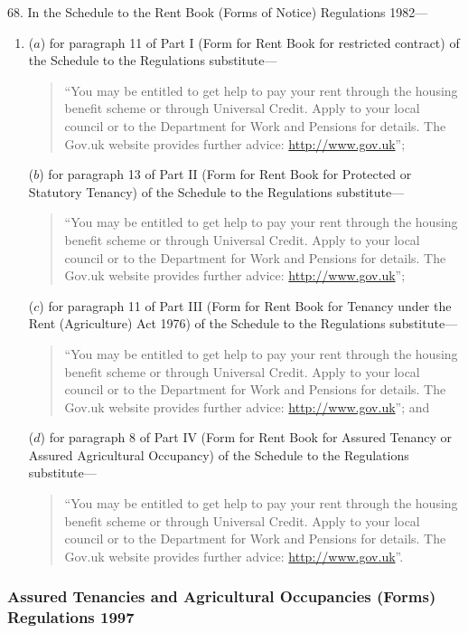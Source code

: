 \documentclass[12pt,a4paper]{article}
\begin{document}
68.  In the Schedule to the Rent Book (Forms of Notice) Regulations 1982—
\begin{enumerate}\item[]
($a$) for paragraph 11 of Part I (Form for Rent Book for restricted contract) of the Schedule to the Regulations substitute—
\begin{quotation}
“You may be entitled to get help to pay your rent through the housing benefit scheme or through Universal Credit. Apply to your local council or to the Department for Work and Pensions for details. The Gov.uk website provides further advice: \url{http://www.gov.uk}”;
\end{quotation}

($b$) for paragraph 13 of Part II (Form for Rent Book for Protected or Statutory Tenancy) of the Schedule to the Regulations substitute—
\begin{quotation}
“You may be entitled to get help to pay your rent through the housing benefit scheme or through Universal Credit. Apply to your local council or to the Department for Work and Pensions for details. The Gov.uk website provides further advice: \url{http://www.gov.uk}”;
\end{quotation}

($c$) for paragraph 11 of Part III (Form for Rent Book for Tenancy under the Rent (Agriculture) Act 1976) of the Schedule to the Regulations substitute—
\begin{quotation}
“You may be entitled to get help to pay your rent through the housing benefit scheme or through Universal Credit. Apply to your local council or to the Department for Work and Pensions for details. The Gov.uk website provides further advice: \url{http://www.gov.uk}”; and
\end{quotation}

($d$) for paragraph 8 of Part IV (Form for Rent Book for Assured Tenancy or Assured Agricultural Occupancy) of the Schedule to the Regulations substitute—
\begin{quotation}
“You may be entitled to get help to pay your rent through the housing benefit scheme or through Universal Credit. Apply to your local council or to the Department for Work and Pensions for details. The Gov.uk website provides further advice: \url{http://www.gov.uk}”.
\end{quotation}
\end{enumerate}

\subsubsection[69. Assured Tenancies and Agricultural Occupancies (Forms) Regulations 1997]{Assured Tenancies and Agricultural Occupancies (Forms) Regulations 1997}
\end{document}
